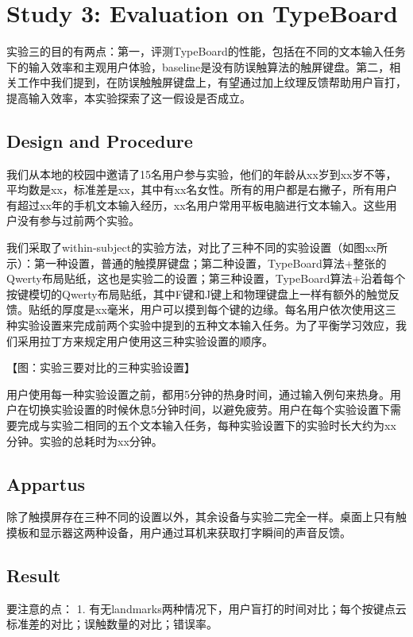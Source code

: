 \section{Study 3: Evaluation on TypeBoard}

实验三的目的有两点：第一，评测TypeBoard的性能，包括在不同的文本输入任务下的输入效率和主观用户体验，baseline是没有防误触算法的触屏键盘。第二，相关工作中我们提到，在防误触触屏键盘上，有望通过加上纹理反馈帮助用户盲打，提高输入效率，本实验探索了这一假设是否成立。

\subsection{Design and Procedure}

我们从本地的校园中邀请了15名用户参与实验，他们的年龄从xx岁到xx岁不等，平均数是xx，标准差是xx，其中有xx名女性。所有的用户都是右撇子，所有用户有超过xx年的手机文本输入经历，xx名用户常用平板电脑进行文本输入。这些用户没有参与过前两个实验。

我们采取了within-subject的实验方法，对比了三种不同的实验设置（如图xx所示）：第一种设置，普通的触摸屏键盘；第二种设置，TypeBoard算法+整张的Qwerty布局贴纸，这也是实验二的设置；第三种设置，TypeBoard算法+沿着每个按键模切的Qwerty布局贴纸，其中F键和J键上和物理键盘上一样有额外的触觉反馈。贴纸的厚度是xx毫米，用户可以摸到每个键的边缘。每名用户依次使用这三种实验设置来完成前两个实验中提到的五种文本输入任务。为了平衡学习效应，我们采用拉丁方来规定用户使用这三种实验设置的顺序。

【图：实验三要对比的三种实验设置】

用户使用每一种实验设置之前，都用5分钟的热身时间，通过输入例句来热身。用户在切换实验设置的时候休息5分钟时间，以避免疲劳。用户在每个实验设置下需要完成与实验二相同的五个文本输入任务，每种实验设置下的实验时长大约为xx分钟。实验的总耗时为xx分钟。

\subsection{Appartus}

除了触摸屏存在三种不同的设置以外，其余设备与实验二完全一样。桌面上只有触摸板和显示器这两种设备，用户通过耳机来获取打字瞬间的声音反馈。

\subsection{Result}

要注意的点：
1. 有无landmarks两种情况下，用户盲打的时间对比；每个按键点云标准差的对比；误触数量的对比；错误率。

